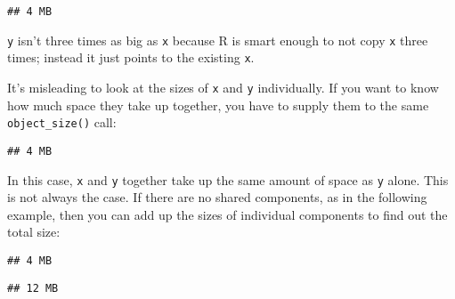 \begin{verbatim}
## 4 MB
\end{verbatim}

\texttt{y} isn't three times as big as \texttt{x} because R is smart
enough to not copy \texttt{x} three times; instead it just points to the
existing \texttt{x}.

It's misleading to look at the sizes of \texttt{x} and \texttt{y}
individually. If you want to know how much space they take up together,
you have to supply them to the same \texttt{object\_size()} call:

\begin{Shaded}
\begin{Highlighting}[]
\end{Highlighting}
\end{Shaded}

\begin{verbatim}
## 4 MB
\end{verbatim}

In this case, \texttt{x} and \texttt{y} together take up the same amount
of space as \texttt{y} alone. This is not always the case. If there are
no shared components, as in the following example, then you can add up
the sizes of individual components to find out the total size:

\begin{Shaded}
\begin{Highlighting}[]
\StringTok{ }\OperatorTok{:}
\StringTok{ }\NormalTok{(}\OperatorTok{:}\NormalTok{, }\OperatorTok{:}\NormalTok{, }\OperatorTok{:}\NormalTok{)}

\end{Highlighting}
\end{Shaded}

\begin{verbatim}
## 4 MB
\end{verbatim}

\begin{Shaded}
\begin{Highlighting}[]
\end{Highlighting}
\end{Shaded}

\begin{verbatim}
## 12 MB
\end{verbatim}

